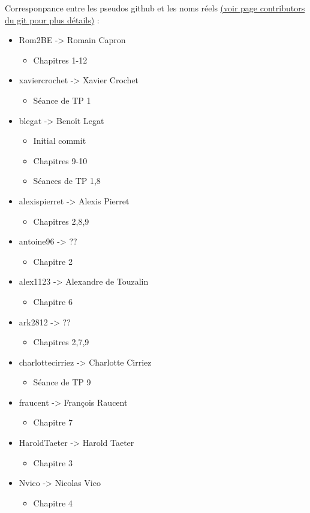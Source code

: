 Corresponpance entre les pseudos github et les noms réels \href{https://github.com/blegat/LINMA1691/graphs/contributors}{(voir page contributors du git pour plus détails)} :
\begin{itemize}
  \item Rom2BE -> Romain Capron
    \begin{itemize}
      \item Chapitres 1-12
    \end{itemize}
  \item xaviercrochet -> Xavier Crochet
    \begin{itemize}
      \item Séance de TP 1
    \end{itemize}
  \item blegat -> Benoît Legat
    \begin{itemize}
      \item Initial commit
      \item Chapitres 9-10
      \item Séances de TP 1,8
    \end{itemize}
  \item alexispierret -> Alexis Pierret
    \begin{itemize}
      \item Chapitres 2,8,9
    \end{itemize}
  \item antoine96 -> ??
    \begin{itemize}
      \item Chapitre 2
    \end{itemize}
  \item alex1123 -> Alexandre de Touzalin
    \begin{itemize}
      \item Chapitre 6
    \end{itemize}
  \item ark2812 -> ??
    \begin{itemize}
      \item Chapitres 2,7,9
    \end{itemize}
  \item charlottecirriez -> Charlotte Cirriez
    \begin{itemize}
      \item Séance de TP 9
    \end{itemize}
  \item fraucent -> François Raucent
    \begin{itemize}
      \item Chapitre 7
    \end{itemize}
  \item HaroldTaeter -> Harold Taeter
    \begin{itemize}
      \item Chapitre 3
    \end{itemize}
  \item Nvico -> Nicolas Vico
    \begin{itemize}
      \item Chapitre 4\\
    \end{itemize}
\end{itemize}

\clearpage
\printindex


